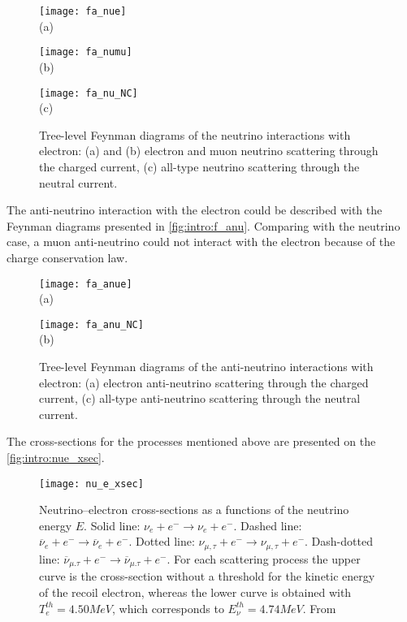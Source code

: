 \documentclass[../main.tex]{subfiles}
\begin{document}
\begin{figure}[!ht]
\centering
  \begin{minipage}[t]{0.29\linewidth}
    \centering
    \texttt{[image: fa\_nue]} \\ (a)
  \end{minipage}
  \begin{minipage}[t]{0.29\linewidth}
    \centering
    \texttt{[image: fa\_numu]} \\ (b)
  \end{minipage}
  \begin{minipage}[t]{0.29\linewidth}
    \centering
    \texttt{[image: fa\_nu\_NC]} \\ (c)
  \end{minipage}
  \caption{Tree-level Feynman diagrams of the neutrino interactions with electron: (a) and (b) electron and muon neutrino scattering through the charged current, (c) all-type neutrino scattering through the neutral current.}
  \label{fig:intro:f_nu}
\end{figure}

The anti-neutrino interaction with the electron could be described with the Feynman diagrams presented in \autoref{fig:intro:f_anu}. Comparing with the neutrino case, a muon anti-neutrino could not interact with the electron because of the charge conservation law.

\begin{figure}[!ht]
\centering
  \begin{minipage}[t]{0.29\linewidth}
    \centering
    \texttt{[image: fa\_anue]} \\ (a)
  \end{minipage}
  \begin{minipage}[t]{0.29\linewidth}
    \centering
    \texttt{[image: fa\_anu\_NC]} \\ (b)
    \end{minipage}
  \caption{Tree-level Feynman diagrams of the anti-neutrino interactions with electron: (a) electron anti-neutrino scattering through the charged current, (c) all-type anti-neutrino scattering through the neutral current.}
  \label{fig:intro:f_anu}
\end{figure}

The cross-sections for the processes mentioned above are presented on the \autoref{fig:intro:nue_xsec}.

\begin{figure}[!ht]
  \centering
  \texttt{[image: nu\_e\_xsec]}
  \caption{Neutrino–electron cross-sections as a functions of the neutrino energy $E$. Solid line: $\nu_e+e^-\to\nu_e+e^-$. Dashed line: $\overline{\nu}_e+e^-\to\overline{\nu}_e+e^-$. Dotted line: $\nu_{\mu, \tau}+e^-\to\nu_{\mu, \tau}+e^-$. Dash-dotted line: $\overline{\nu}_{\mu. \tau}+e^-\to\overline{\nu}_{\mu. \tau}+e^-$. For each scattering process the upper curve is the cross-section without a threshold for the kinetic energy of the recoil electron, whereas the lower curve is obtained with $T_e^{th}=4.50 MeV$, which corresponds to $E_\nu^{th} = 4.74 MeV$. From~\cite{Auerbach2001}}
  \label{fig:intro:nue_xsec}
\end{figure}
\end{document}
